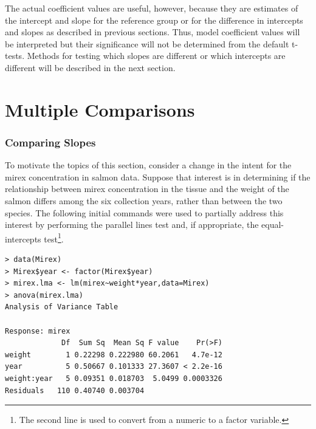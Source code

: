 \documentclass[10pt,openany]{book}\usepackage[]{graphicx}\usepackage[]{color}
\makeatletter
\newenvironment{kframe}{%
 \def\at@end@of@kframe{}%
 \ifinner\ifhmode%
  \def\at@end@of@kframe{\end{minipage}}%
  \begin{minipage}{\columnwidth}%
 \fi\fi%
 \def\FrameCommand##1{\hskip\@totalleftmargin \hskip-\fboxsep
 \colorbox{shadecolor}{##1}\hskip-\fboxsep
     \hskip-\linewidth \hskip-\@totalleftmargin \hskip\columnwidth}%
 \MakeFramed {\advance\hsize-\width
   \@totalleftmargin\z@ \linewidth\hsize
   \@setminipage}}%
 {\par\unskip\endMakeFramed%
 \at@end@of@kframe}
\newenvironment{knitrout}{}{} %
\makeatother
\begin{document}

\vspace{-12pt}

The actual coefficient values are useful, however, because they are estimates of the intercept and slope for the reference group or for the difference in intercepts and slopes as described in previous sections.  Thus, model coefficient values will be interpreted but their significance will not be determined from the default t-tests.  Methods for testing which slopes are different or which intercepts are different will be described in the next section.



\section{Multiple Comparisons} \label{sect:IVRMultComparisons}
\subsubsection*{Comparing Slopes}
To motivate the topics of this section, consider a change in the intent for the mirex concentration in salmon data.  Suppose that interest is in determining if the relationship between mirex concentration in the tissue and the weight of the salmon differs among the six collection years, rather than between the two species.  The following initial commands were used to partially address this interest by performing the parallel lines test and, if appropriate, the equal-intercepts test\footnote{The second line is used to convert  from a numeric to a factor variable.}.

\begin{knitrout}
\color{fgcolor}\begin{kframe}
\begin{verbatim}
> data(Mirex)
> Mirex$year <- factor(Mirex$year)
> mirex.lma <- lm(mirex~weight*year,data=Mirex)
> anova(mirex.lma)
Analysis of Variance Table

Response: mirex
             Df  Sum Sq  Mean Sq F value    Pr(>F)
weight        1 0.22298 0.222980 60.2061   4.7e-12
year          5 0.50667 0.101333 27.3607 < 2.2e-16
weight:year   5 0.09351 0.018703  5.0499 0.0003326
Residuals   110 0.40740 0.003704                  
\end{verbatim}
\end{kframe}
\end{knitrout}
\end{document}
